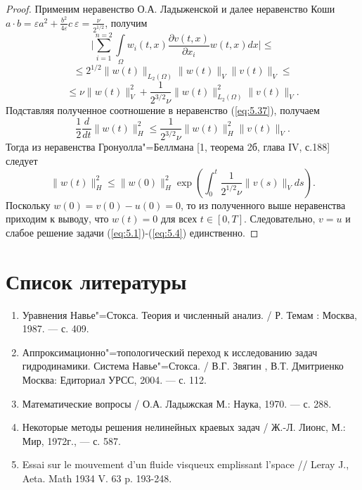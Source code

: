 \begin{proof}
    Применим неравенство О.А. Ладыженской и далее неравенство Коши \linebreak
    $a\cdot b=\varepsilon a^2+\frac{b^2}{4\varepsilon}c \ \varepsilon=\frac{\nu}{2^{1/2}}$, получим
    $$\bigg|\sum_{i=1}^{n=2}\int\limits_\Omega w_i(t, x)\frac{\partial v(t, x)}{\partial x_i}w(t, x)dx\bigg|\le$$
    $$\le 2^{1/2}\| w(t)\|_{L_2(\Omega)}\| w(t)\|_V\| v(t)\|_V\le$$
    $$\le \nu\| w(t)\|_V^2+\frac{1}{2^{3/2}\nu}\| w(t)\|_{L_2(\Omega)}^2\| v(t)\|_V.$$
    Подставляя полученное соотношение в неравенство (\ref{eq:5.37}), получаем
    $$\frac{1}{2}\frac{d}{dt}\| w(t)\|_H^2\le\frac{1}{2^{3/2}\nu}\| w(t)\|_H^2\| v(t)\|_V.$$
    Тогда из неравенства Гронуолла"=Беллмана [1, теорема 2б, глава IV, с.188] следует
    $$\| w(t)\|_H^2\le\| w(0)\|_H^2\exp\left(\int_0^t\frac{1}{2^{1/2}\nu}\| v(s)\|_Vds\right).$$
    Поскольку $w(0) = v(0)- u(0) = 0$, то из полученного выше неравенства приходим к выводу,
    что $w(t)=0$ для всех $t\in[0, T]$. Следовательно, $v=u$ и слабое решение задачи (\ref{eq:5.1})-(\ref{eq:5.4}) единственно.
\end{proof}


\clearpage
\section*{Список литературы}
\begin{enumerate} 
    \item Уравнения Навье"=Стокса. Теория и численный анализ. / Р. Темам : Москва, 1987. — с. 409.
    \item  Аппроксимационно"=топологический переход к исследованию задач гидродинамики. 
    Система Навье"=Стокса. / В.Г. Звягин , В.Т. Дмитриенко  Москва: Едиториал УРСС, 2004. — с. 112.
    \item  Математические вопросы / О.А. Ладыжская  М.: Наука, 1970. — с. 288.
    \item Некоторые методы решения нелинейных краевых задач / Ж.-Л. Лионс, М.: Мир, 1972г., — с. 587.
    \item Essai sur le mouvement d'un fluide visqueux emplissant l'space // \linebreak Leray J., Aeta. 
    Math 1934 V. 63 p. 193-248.
\end{enumerate}

